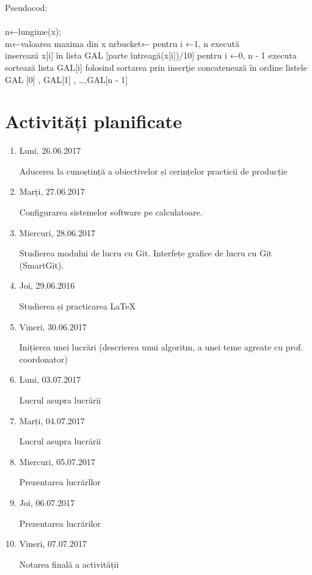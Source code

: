 \documentclass{report}
\begin{document}
\vskip 0.5cm

\huge{Pseudocod:\\ \\
n←lungime(x);\\
m←valoarea maxima din x
nrbucket←
pentru i ←1, n execută\\
inserează x[i] în lista GAL [parte întreagă(x[i])/10]
 pentru i ←0, n - 1 executa
         sortează lista GAL[i] folosind sortarea prin inserţie
concatenează în ordine listele GAL [0] , GAL[1] , …,GAL[n - 1]
}
\chapter{Activități planificate}

\begin{enumerate}

\item  Luni, 26.06.2017 \newline

Aducerea la cunoștință a obiectivelor și cerințelor practicii de producție

\item  Marți, 27.06.2017 \newline

Configurarea sistemelor software pe calculatoare. 

\item  Miercuri, 28.06.2017 \newline

Studierea modului de lucru cu Git. Interfețe grafice de lucru cu Git (SmartGit).

\item  Joi, 29.06.2016 \newline

Studierea și practicarea LaTeX

\item  Vineri, 30.06.2017  \newline

Inițierea unei lucrări (descrierea unui algoritm, a unei teme agreate cu prof. coordonator)

\item  Luni, 03.07.2017  \newline

Lucrul asupra lucrării

\item  Marți, 04.07.2017  \newline

Lucrul asupra lucrării

\item  Miercuri, 05.07.2017  \newline

Prezentarea lucrărllor

\item  Joi, 06.07.2017  \newline

Prezentarea lucrărilor

\item  Vineri, 07.07.2017  \newline

Notarea finală a activității

\end{enumerate}
\end{document}
